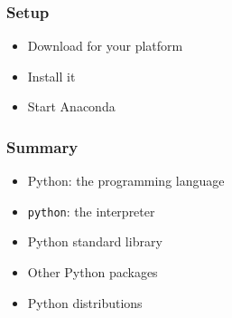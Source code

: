 \documentclass[14pt,compress]{beamer}
\newcommand{\typ}[1]{\lstinline{#1}}
\begin{document}
\begin{frame}[plain]
  \frametitle{Setup}
  \begin{itemize}
    \item Download for your platform
    \item Install it
    \item Start Anaconda
  \end{itemize}
\end{frame}

\begin{frame}[plain]
  \frametitle{Summary}
  \begin{itemize}
  \item Python: the programming language
  \item \typ{python}: the interpreter
  \item Python standard library
  \item Other Python packages
  \item Python distributions
  \end{itemize}
\end{frame}
\end{document}
